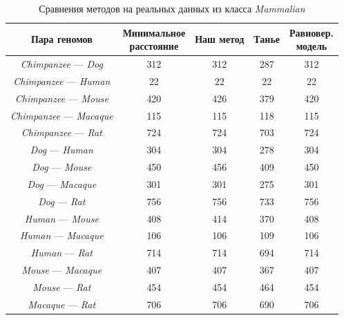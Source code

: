 \begin{table}[!h]
    \caption{Сравнения методов на реальных данных из класса \emph{Mammalian}}
    \centering
    \begin{tabular}{|*{5}{c|}}\hline
        Пара геномов &  \makecell{Минимальное \\ расстояние}
                     & Наш метод
                     & Танье
                     & \makecell{Равновер. \\ модель} \\\hline
                    \emph{Chimpanzee} --- \emph{Dog}    & 312 & 312 & 287 & 312     \\\hline
                    \emph{Chimpanzee} --- \emph{Human}    & 22 & 22 & 22 & 22     \\\hline
                    \emph{Chimpanzee} --- \emph{Mouse}    & 420 & 426 & 379 & 420     \\\hline
                    \emph{Chimpanzee} --- \emph{Macaque}    & 115 & 115 & 118 & 115     \\\hline
                    \emph{Chimpanzee} --- \emph{Rat}    & 724 & 724 & 703 & 724     \\\hline
                    \emph{Dog} --- \emph{Human}    & 304 & 304 & 278 & 304     \\\hline
                    \emph{Dog} --- \emph{Mouse}    & 450 & 456 & 409 & 450     \\\hline
                    \emph{Dog} --- \emph{Macaque}    & 301 & 301 & 275 & 301     \\\hline
                    \emph{Dog} --- \emph{Rat}    & 756 & 756 & 733 & 756     \\\hline
                    \emph{Human} --- \emph{Mouse}    & 408 & 414 & 370 & 408     \\\hline
                    \emph{Human} --- \emph{Macaque}    & 106 & 106 & 109 & 106     \\\hline
                    \emph{Human} --- \emph{Rat}    & 714 & 714 & 694 & 714     \\\hline
                    \emph{Mouse} --- \emph{Macaque}    & 407 & 407 & 367 & 407     \\\hline
                    \emph{Mouse} --- \emph{Rat}    & 454 & 454 & 464 & 454     \\\hline
                    \emph{Macaque} --- \emph{Rat}    & 706 & 706 & 690 & 706     \\\hline
    \end{tabular}
    \label{real-data-mammalian}
\end{table}

